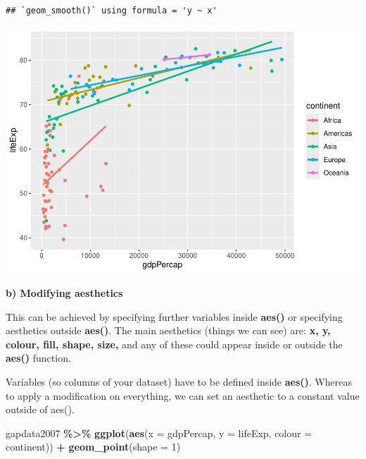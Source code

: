 \documentclass[
]{book}
\newenvironment{Shaded}{\begin{snugshade}}{\end{snugshade}}
\newcommand{\AttributeTok}[1]{\textcolor[rgb]{0.13,0.29,0.53}{#1}}
\newcommand{\DecValTok}[1]{\textcolor[rgb]{0.00,0.00,0.81}{#1}}
\newcommand{\FunctionTok}[1]{\textcolor[rgb]{0.13,0.29,0.53}{\textbf{#1}}}
\newcommand{\NormalTok}[1]{#1}
\newcommand{\SpecialCharTok}[1]{\textcolor[rgb]{0.81,0.36,0.00}{\textbf{#1}}}
\begin{document}
\begin{verbatim}
## `geom_smooth()` using formula = 'y ~ x'
\end{verbatim}

\includegraphics{_main_files/figure-latex/unnamed-chunk-81-1.pdf}

\textbf{b) Modifying aesthetics}

This can be achieved by specifying further variables inside \textbf{aes()} or specifying aesthetics outside \textbf{aes()}. The main aesthetics (things we can see) are: \textbf{x, y, colour, fill, shape, size,} and any of these could appear inside or outside the \textbf{aes()} function.

Variables (so columns of your dataset) have to be defined inside \textbf{aes()}. Whereas to apply a modification on everything, we can set an aesthetic to a constant value outside of aes().

\begin{Shaded}
\begin{Highlighting}[]
\NormalTok{gapdata2007 }\SpecialCharTok{\%\textgreater{}\%}
\FunctionTok{ggplot}\NormalTok{(}\FunctionTok{aes}\NormalTok{(}\AttributeTok{x =}\NormalTok{ gdpPercap, }\AttributeTok{y =}\NormalTok{ lifeExp, }\AttributeTok{colour =}\NormalTok{ continent)) }\SpecialCharTok{+}
\FunctionTok{geom\_point}\NormalTok{(}\AttributeTok{shape =} \DecValTok{1}\NormalTok{)}
\end{Highlighting}
\end{Shaded}
\end{document}
